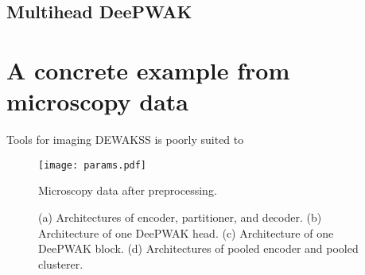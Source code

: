 \documentclass{article}
\begin{document}
\subsection{Multihead DeePWAK}

\section{A concrete example from microscopy data}
Tools for imaging 
DEWAKSS is poorly suited to 

\begin{figure}
  \texttt{[image: params.pdf]}
    \caption{Microscopy data after preprocessing. }
    \label{fig:}
\end{figure}
  
\begin{figure}
     \begin{subfigure}[b]{0.5\textwidth}
        
         \caption{}
         \label{fig:}
     \end{subfigure}
     \hfill
     \begin{subfigure}[b]{0.5\textwidth}
        
         \caption{}
         \label{fig:}
     \end{subfigure}

     \vspace{1cm}
     \begin{subfigure}[b]{0.5\textwidth}
        
         \caption{}
         \label{fig:}
     \end{subfigure}
     \hfill
     \begin{subfigure}[b]{\textwidth}
       
       \caption{}
       \label{fig:}
     \end{subfigure}
     

     \caption{(a) Architectures of encoder, partitioner, and decoder.
       (b) Architecture of one DeePWAK head.
       (c) Architecture of one DeePWAK block.
       (d) Architectures of pooled encoder and pooled clusterer.
       }
     \label{fig:}
\end{figure}
\end{document}
